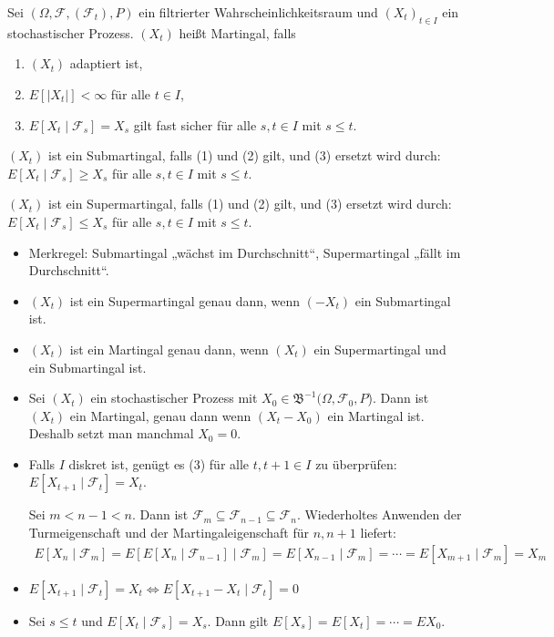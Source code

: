 \documentclass[a4paper,twoside,DIV15,BCOR12mm]{scrbook}
\newcommand{\cF}{\mathcal F}
\newcommand{\borel}{{\mathfrak B}}
\begin{document}
\begin{definition}
Sei $(\Omega, \cF, (\cF_t), P)$ ein filtrierter Wahrscheinlichkeitsraum und $(X_t)_{t\in I}$ ein stochastischer Prozess. $(X_t)$ heißt Martingal, falls 
\begin{enumerate}
\item $(X_t)$ adaptiert ist,
\item $E[|X_t|] < \infty$ für alle $t\in I$,
\item $E[X_t\mid \cF_s] = X_s$ gilt fast sicher für alle $s,t\in I$ mit $s\le t$.
\end{enumerate}

$(X_t)$ ist ein Submartingal, falls (1) und (2) gilt, und (3) ersetzt wird durch: $E[X_t\mid \cF_s] \ge X_s$ für alle $s,t\in I$ mit $s\le t$.

$(X_t)$ ist ein Supermartingal, falls (1) und (2) gilt, und (3) ersetzt wird durch: $E[X_t\mid \cF_s] \le X_s$ für alle $s,t\in I$ mit $s\le t$.
\end{definition}

\begin{bemerkung}
\begin{itemize}
\item Merkregel: Su\rlap{\hspace{-1.1pt}\raisebox{5pt}{$\uparrow$}}bmartingal „wächst im Durchschnitt“, 
Su\rlap{\hspace{-1.1pt}\raisebox{-5pt}{$\downarrow$}}permartingal „fällt im Durchschnitt“. 
\item $(X_t)$ ist ein Supermartingal genau dann, wenn $(-X_t)$ ein Submartingal ist.
\item $(X_t)$ ist ein Martingal genau dann, wenn $(X_t)$ ein Supermartingal und ein Submartingal ist.
\item Sei $(X_t)$ ein stochastischer Prozess mit $X_0\in \borel^{-1}(\Omega, \cF_0, P$). Dann ist $(X_t)$ ein Martingal, genau dann wenn $(X_t-X_0)$ ein Martingal ist. Deshalb setzt man manchmal $X_0=0$.
\item Falls $I$ diskret ist, genügt es (3) für alle $t, t+1\in I$ zu überprüfen: $E[X_{t+1}\mid \cF_t] = X_t$.

\begin{beweis}
Sei $m< n-1 < n$. Dann ist $\cF_m \subseteq \cF_{n-1} \subseteq \cF_n$. Wiederholtes Anwenden der Turmeigenschaft und der Martingaleigenschaft für $n, n+1$ liefert:
\begin{align*}
E[X_n\mid\cF_m] = E[ E[X_n\mid \cF_{n-1}] \mid \cF_m] = E[ X_{n-1} \mid \cF_m] = \cdots = E[X_{m+1} \mid \cF_m] = X_m
\end{align*}
\end{beweis}
\item $E[X_{t+1} \mid \cF_t] = X_t \iff E[X_{t+1}-X_t \mid \cF_t] = 0$
\item Sei $s\le t$ und $E[X_t \mid \cF_s] = X_s$. Dann gilt $E[X_s] = E[X_t] = \cdots = EX_0$.
\end{itemize}
\end{bemerkung}
\end{document}
